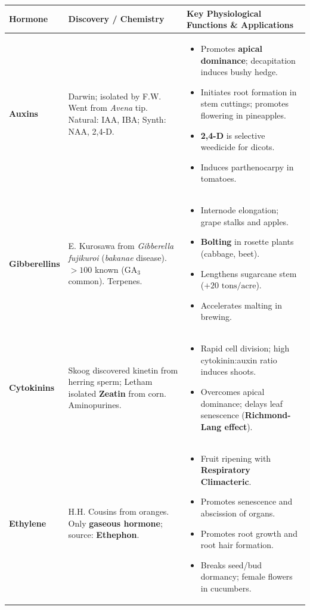 \documentclass[10pt,twoside,openright]{book}
\begin{document}
\begin{conceptbox}
\begin{center}
\scriptsize
\setlength{\tabcolsep}{2.5pt}
\renewcommand{\arraystretch}{1.15}
\begin{tabularx}{\linewidth}{>{\bfseries\RaggedRight}p{1.8cm} >{\RaggedRight}p{2.4cm} >{\RaggedRight}X}
\toprule
\textbf{Hormone} & \textbf{Discovery / Chemistry} & \textbf{Key Physiological Functions \& Applications} \\
\midrule
Auxins & Darwin; isolated by F.W. Went from \textit{Avena} tip. Natural: IAA, IBA; Synth: NAA, 2,4-D. & \begin{itemize}[leftmargin=*,nosep] \item Promotes \textbf{apical dominance}; decapitation induces bushy hedge. \item Initiates root formation in stem cuttings; promotes flowering in pineapples. \item \textbf{2,4-D} is selective weedicide for dicots. \item Induces parthenocarpy in tomatoes. \end{itemize} \\
\midrule
Gibberellins & E. Kurosawa from \textit{Gibberella fujikuroi} (\textit{bakanae} disease). $>100$ known ($\mathrm{GA}_3$ common). Terpenes. & \begin{itemize}[leftmargin=*,nosep] \item Internode elongation; grape stalks and apples. \item \textbf{Bolting} in rosette plants (cabbage, beet). \item Lengthens sugarcane stem ($+20\text{ tons/acre}$). \item Accelerates malting in brewing. \end{itemize} \\
\midrule
Cytokinins & Skoog discovered kinetin from herring sperm; Letham isolated \textbf{Zeatin} from corn. Aminopurines. & \begin{itemize}[leftmargin=*,nosep] \item Rapid cell division; high cytokinin:auxin ratio induces shoots. \item Overcomes apical dominance; delays leaf senescence (\textbf{Richmond-Lang effect}). \end{itemize} \\
\midrule
Ethylene & H.H. Cousins from oranges. Only \textbf{gaseous hormone}; source: \textbf{Ethephon}. & \begin{itemize}[leftmargin=*,nosep] \item Fruit ripening with \textbf{Respiratory Climacteric}. \item Promotes senescence and abscission of organs. \item Promotes root growth and root hair formation. \item Breaks seed/bud dormancy; female flowers in cucumbers. \end{itemize} \\

\end{tabularx}
\end{center}
\end{conceptbox}
\end{document}
